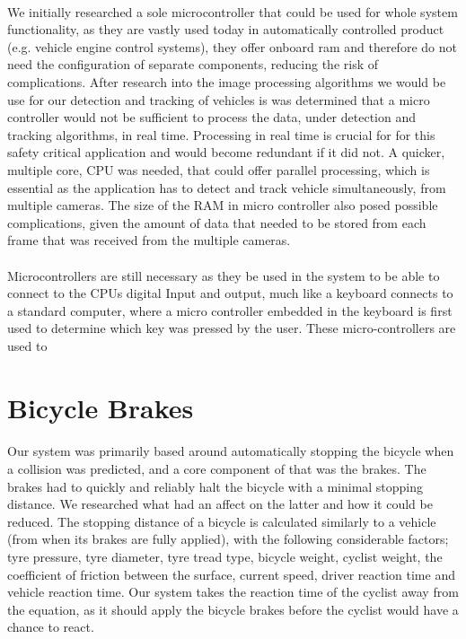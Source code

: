 \documentclass[a4paper]{report}
\begin{document}
\paragraph{}We initially researched a sole microcontroller that could be used for whole system functionality, as they are vastly used today in automatically controlled product (e.g. vehicle engine control systems), they offer onboard ram and therefore do not need the configuration of separate components, reducing the risk of complications.  After research into the image processing algorithms we would be use for our detection and tracking of vehicles is was determined that a micro controller would not be sufficient to process the data, under detection and tracking algorithms, in real time. Processing in real time is crucial for for this safety critical application and would become redundant if it did not. A quicker, multiple core, CPU was needed, that could offer parallel processing, which is essential as the application has to detect and track vehicle simultaneously, from multiple cameras. The size of the RAM in micro controller also posed possible complications, given the amount of data that needed to be stored from each frame that was received from the multiple cameras.

\paragraph{}Microcontrollers are still necessary as they be used in the system to be able to connect to the CPUs digital Input and output, much like a keyboard connects to a standard computer, where a micro controller embedded in the keyboard is first used to determine which key was pressed by the user. These micro-controllers are used to 

\section{Bicycle Brakes}

\paragraph{}Our system was primarily based around automatically stopping the bicycle when a collision was predicted, and a core component of that was the brakes. The brakes had to quickly and reliably halt the bicycle with a minimal stopping distance. We researched what had an affect on the latter and how it could be reduced. The stopping distance of a bicycle is calculated similarly to a vehicle (from when its brakes are fully applied), with the following considerable factors; tyre pressure, tyre diameter, tyre tread type, bicycle weight, cyclist weight, the coefficient of friction between the surface, current speed, driver reaction time and vehicle reaction time. Our system takes the reaction time of the cyclist away from the equation, as it should apply the bicycle brakes before the cyclist would have a chance to react. 
\end{document}
